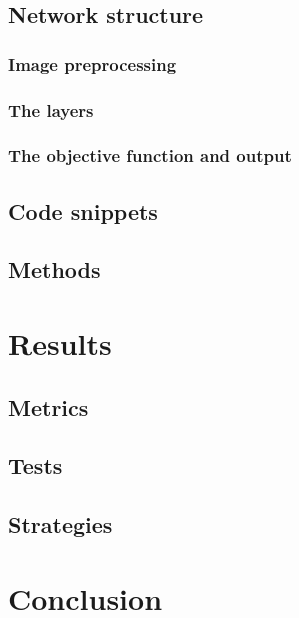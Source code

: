 \documentclass[a4paper]{article}
\begin{document}
\subsection{Network structure}

\subsubsection{Image preprocessing}

\subsubsection{The layers}

\subsubsection{The objective function and output}

\subsection{Code snippets}

\subsection{Methods}

\newpage
\section{Results}
\subsection{Metrics}

\subsection{Tests}

\subsection{Strategies}

\newpage
\section{Conclusion}

\begin{appendix}
	\listoffigures
	\listoftables
\end{appendix}
\end{document}
